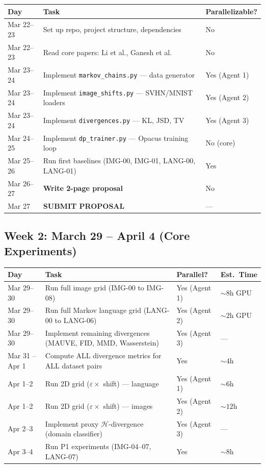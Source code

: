 \documentclass[11pt,a4paper]{article}
\begin{document}
\begin{small}
\begin{longtable}{@{}p{2cm}p{8cm}p{2.5cm}@{}}
\toprule
\textbf{Day} & \textbf{Task} & \textbf{Parallelizable?} \\
\midrule
\endhead
Mar 22--23 & Set up repo, project structure, dependencies & No \\
Mar 22--23 & Read core papers: Li et al., Ganesh et al. & No \\
Mar 23--24 & Implement \texttt{markov\_chains.py} --- data generator & Yes (Agent 1) \\
Mar 23--24 & Implement \texttt{image\_shifts.py} --- SVHN/MNIST loaders & Yes (Agent 2) \\
Mar 23--24 & Implement \texttt{divergences.py} --- KL, JSD, TV & Yes (Agent 3) \\
Mar 24--25 & Implement \texttt{dp\_trainer.py} --- Opacus training loop & No (core) \\
Mar 25--26 & Run first baselines (IMG-00, IMG-01, LANG-00, LANG-01) & Yes \\
Mar 26--27 & \textbf{Write 2-page proposal} & No \\
Mar 27 & \textbf{SUBMIT PROPOSAL} & --- \\
\bottomrule
\end{longtable}
\end{small}

\subsection{Week 2: March 29 -- April 4 (Core Experiments)}

\begin{small}
\begin{longtable}{@{}p{2cm}p{7cm}p{2.5cm}p{1.5cm}@{}}
\toprule
\textbf{Day} & \textbf{Task} & \textbf{Parallel?} & \textbf{Est.\ Time} \\
\midrule
\endhead
Mar 29--30 & Run full image grid (IMG-00 to IMG-08) & Yes (Agent 1) & ${\sim}8$h GPU \\
Mar 29--30 & Run full Markov language grid (LANG-00 to LANG-06) & Yes (Agent 2) & ${\sim}2$h GPU \\
Mar 29--30 & Implement remaining divergences (MAUVE, FID, MMD, Wasserstein) & Yes (Agent 3) & --- \\
Mar 31 -- Apr 1 & Compute ALL divergence metrics for ALL dataset pairs & Yes & ${\sim}4$h \\
Apr 1--2 & Run 2D grid ($\varepsilon \times$ shift) --- language & Yes (Agent 1) & ${\sim}6$h \\
Apr 1--2 & Run 2D grid ($\varepsilon \times$ shift) --- images & Yes (Agent 2) & ${\sim}12$h \\
Apr 2--3 & Implement proxy $\mathcal{H}$-divergence (domain classifier) & Yes (Agent 3) & --- \\
Apr 3--4 & Run P1 experiments (IMG-04--07, LANG-07) & Yes & ${\sim}8$h \\
\bottomrule
\end{longtable}
\end{small}
\end{document}
